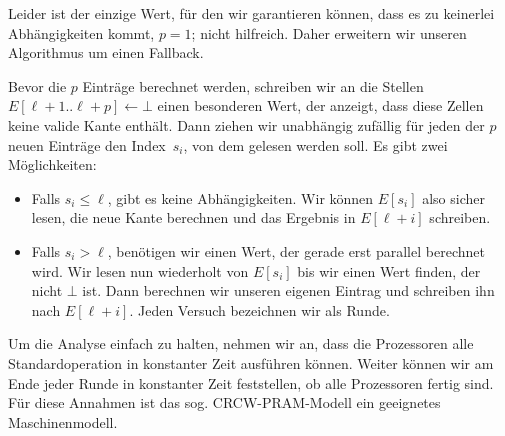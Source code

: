 \begin{center}
\end{center}

Leider ist der einzige Wert, für den wir garantieren können, dass es zu keinerlei Abhängigkeiten kommt, $p=1$; nicht hilfreich.
Daher erweitern wir unseren Algorithmus um einen Fallback.

Bevor die $p$ Einträge berechnet werden, schreiben wir an die Stellen $E[\ell+1..\ell+p] \gets \bot$ einen besonderen Wert, der anzeigt, dass diese Zellen keine valide Kante enthält.
Dann ziehen wir unabhängig zufällig für jeden der $p$ neuen Einträge den Index~$s_i$, von dem gelesen werden soll.
Es gibt zwei Möglichkeiten:
\begin{itemize}
    \item Falls $s_i \le \ell$, gibt es keine Abhängigkeiten.
          Wir können $E[s_i]$ also sicher lesen, die neue Kante berechnen und das Ergebnis in $E[\ell + i]$ schreiben.
    \item Falls $s_i > \ell$, benötigen wir einen Wert, der gerade erst parallel berechnet wird.
          Wir lesen nun wiederholt von $E[s_i]$ bis wir einen Wert finden, der nicht $\bot$ ist.
          Dann berechnen wir unseren eigenen Eintrag und schreiben ihn nach $E[\ell +i]$.
          Jeden Versuch bezeichnen wir als Runde.
\end{itemize}

Um die Analyse einfach zu halten, nehmen wir an, dass die Prozessoren alle Standardoperation in konstanter Zeit ausführen können.
Weiter können wir am Ende jeder Runde in konstanter Zeit feststellen, ob alle Prozessoren fertig sind.
Für diese Annahmen ist das sog. CRCW-PRAM-Modell ein geeignetes Maschinenmodell.


